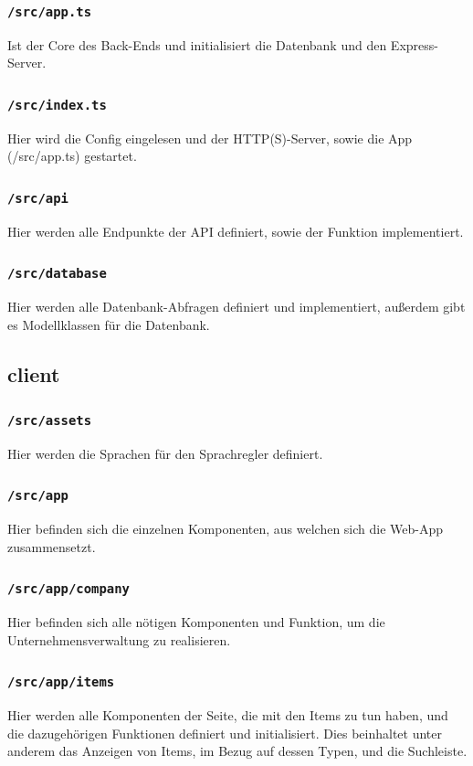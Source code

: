 \documentclass[11pt,a4paper]{report}
\begin{document}
	\subsubsection*{\texttt{/src/app.ts}}
	Ist der Core des Back-Ends und initialisiert die Datenbank und den Express-Server.
	
	\subsubsection*{\texttt{/src/index.ts}}
	Hier wird die Config eingelesen und der HTTP(S)-Server, sowie die App (/src/app.ts) gestartet.

	\subsubsection*{\texttt{/src/api}}
	Hier werden alle Endpunkte der API definiert, sowie der Funktion implementiert.
	
	\subsubsection*{\texttt{/src/database}}
	Hier werden alle Datenbank-Abfragen definiert und implementiert, außerdem gibt es Modellklassen für die Datenbank.
	
	
	\subsection{client}
	
	\subsubsection*{\texttt{/src/assets}}
	Hier werden die Sprachen für den Sprachregler definiert.	
		
	\subsubsection*{\texttt{/src/app}}
	Hier befinden sich die einzelnen Komponenten, aus welchen sich die Web-App zusammensetzt.

	\subsubsection*{\texttt{/src/app/company}}
	Hier befinden sich alle nötigen Komponenten und Funktion, um die Unternehmensverwaltung zu realisieren. 

	\subsubsection*{\texttt{/src/app/items}}
	Hier werden alle Komponenten der Seite, die mit den Items zu tun haben, und die dazugehörigen Funktionen definiert und initialisiert. 
	Dies beinhaltet unter anderem das Anzeigen von Items, im Bezug auf dessen Typen, und die Suchleiste.
	
\end{document}
